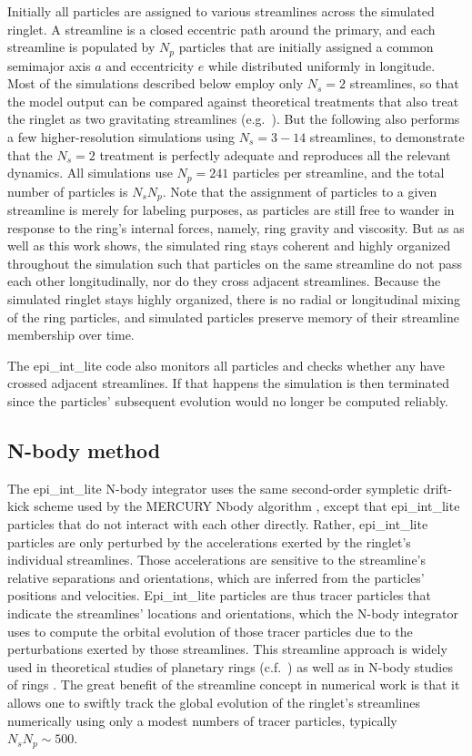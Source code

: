 \documentclass[preprint]{aastex62}
\begin{document}
Initially all particles are assigned to various streamlines across the simulated ringlet. A streamline
is a closed eccentric path around the primary, and each streamline is populated by $N_p$ particles that are
initially assigned a common semimajor axis $a$ and eccentricity $e$ while
distributed uniformly in longitude. Most of the simulations described below
employ only $N_s=2$ streamlines, so that the model output can be compared against
theoretical treatments that also treat the ringlet as two gravitating streamlines
(e.g.\ \citealt{BGT83}). But the following also performs a few higher-resolution simulations
using $N_s=3-14$ streamlines, to demonstrate that the $N_s=2$ treatment is perfectly
adequate and reproduces all the relevant dynamics. All simulations use $N_p=241$ particles 
per streamline, and the total number of particles is $N_sN_p$.
Note that the assignment of particles to a given streamline is merely
for labeling purposes, as particles are still free to wander in response
to the ring’s internal forces, namely, ring gravity and viscosity. But as \cite{HS13} as well
as this work shows, the simulated ring stays coherent and highly organized throughout the 
simulation such that particles on the same streamline do not pass each other longitudinally,
nor do they cross adjacent streamlines. Because the simulated ringlet stays highly organized,
there is no radial or longitudinal mixing of the ring particles, and simulated particles preserve
memory of their streamline membership over time. 

The epi\_int\_lite code also monitors all particles and checks whether any have crossed adjacent streamlines.
If that happens the simulation is then terminated since the particles' subsequent evolution
would no longer be computed reliably.

\subsection{N-body method}
\label{subsec:N-body method}

The epi\_int\_lite N-body integrator uses the same second-order sympletic drift-kick
scheme used by the MERCURY Nbody algorithm \citep{C99}, except that
epi\_int\_lite particles that do not interact with each other directly.
Rather, epi\_int\_lite particles
are only perturbed by the accelerations exerted by the ringlet's individual streamlines. 
Those accelerations are sensitive to the streamline's relative separations and orientations, 
which are inferred from the particles' positions
and velocities. Epi\_int\_lite particles are thus tracer particles
that indicate the streamlines' locations and orientations, which the N-body
integrator uses to compute the orbital evolution of those tracer particles
due to the perturbations exerted by those streamlines. This streamline approach 
is widely used in theoretical studies of planetary rings (c.f.\ \citealt{GT79, BGT83, BGT85})
as well as in N-body studies of rings \citep{HS13, RHH16}. The great benefit of the streamline concept
in numerical work is that it allows one to swiftly track the 
global evolution of the ringlet's streamlines numerically
using only a modest numbers of tracer particles, typically $N_sN_p\sim500$.
\end{document}
